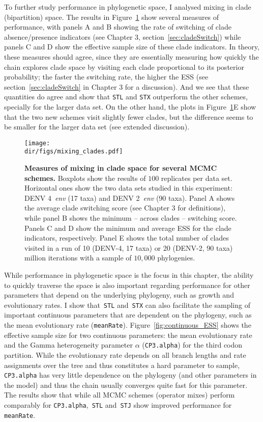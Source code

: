 To further study performance in phylogenetic space, I analysed mixing in clade (bipartition) space.
The results in Figure~\ref{fig:mixing_clades} show several measures of performance, with panels A and B showing the rate of switching of clade absence/presence indicators (see Chapter 3, section~\ref{sec:cladeSwitch}) while panels C and D show the effective sample size of these clade indicators.
In theory, these measures should agree, since they are essentially measuring how quickly the chain explores clade space by visiting each clade proportional to its posterior probability; the faster the switching rate, the higher the ESS (see section~\ref{sec:cladeSwitch} in Chapter 3 for a discussion).
And we see that these quantities do agree and show that \verb|STL| and \verb|STX|  outperform the other schemes, specially for the larger data set.
On the other hand, the plots in Figure~\ref{fig:mixing_clades}E show that the two new schemes visit slightly fewer clades, but the difference seems to be smaller for the larger data set (see extended discussion).
\begin{figure}[!ht]
\begin{center}
\texttt{[image: \\dir/figs/mixing\_clades.pdf]} 
\end{center}
 \caption[Measures of mixing in clade space for several MCMC schemes.]{\textbf{Measures of mixing in clade space for several MCMC schemes.}
  Boxplots show the results of $100$ replicates per data set.
  Horizontal ones show the two data sets studied in this experiment: DENV 4~\textit{env} (17 taxa) and DENV 2~\textit{env} (90 taxa).
  Panel A shows the average clade switching score (see Chapter 3 for definitions), while panel B shows the minimum -- across clades -- switching score.
  Panels C and D show the minimum and average ESS for the clade indicators, respectively.
  Panel E shows the total number of clades visited in a run of 10 (DENV-4, 17 taxa) or 20 (DENV-2, 90 taxa) million iterations with a sample of $10, 000$  phylogenies.
  }
 \label{fig:mixing_clades}
\end{figure}

While performance in phylogenetic space is the focus in this chapter, the ability to quickly traverse the space is also important regarding performance for other parameters that depend on the underlying phylogeny, such as growth and evolutionary rates.
I show that~\verb|STL| and~\verb|STX| can also facilitate the sampling of important continuous parameters that are dependent on the phylogeny, such as the mean evolutionary rate (\verb|meanRate|).
Figure~\ref{fig:continuous_ESS} shows the effective sample size for two continuous parameters: the mean evolutionary rate and the Gamma heterogeneity parameter $\alpha$  (\verb|CP3.alpha|) for the third codon partition.
While the evolutionary rate depends on all branch lengths and rate assignments over the tree and thus constitutes a hard parameter to sample, \verb|CP3.alpha| has very little dependence on the phylogeny (and other parameters in the model) and thus the chain usually converges quite fast for this parameter.
The results show that while all MCMC schemes (operator mixes) perform comparably for \verb|CP3.alpha|,~\verb|STL| and~\verb|STJ| show improved performance for \verb|meanRate|.

